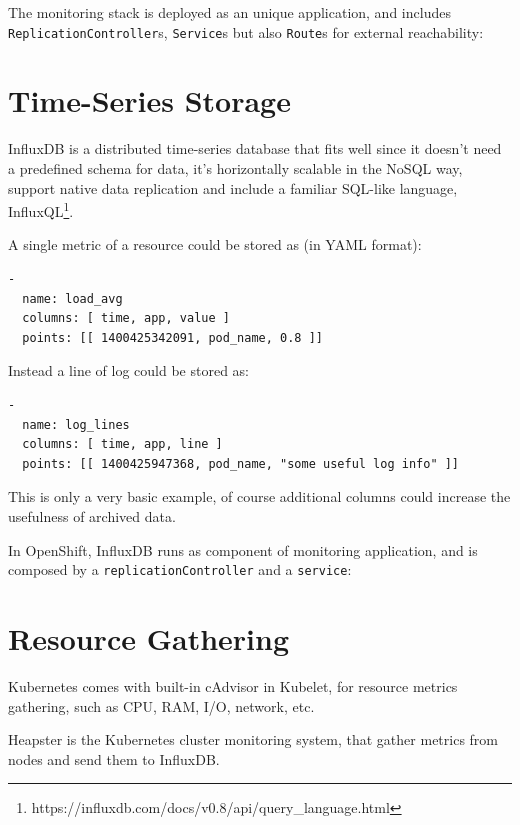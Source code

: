 The monitoring stack is deployed as an unique application, and includes
\texttt{ReplicationController}s, \texttt{Service}s but also
\texttt{Route}s for external reachability:

\section{Time-Series Storage}\label{time-series-storage}

InfluxDB is a distributed time-series database that fits well since it
doesn't need a predefined schema for data, it's horizontally scalable
in the NoSQL way, support native data replication and include a familiar
SQL-like language, InfluxQL\footnote{https://influxdb.com/docs/v0.8/api/query\_language.html}.

A single metric of a resource could be stored as (in YAML format):

\begin{verbatim}
- 
  name: load_avg
  columns: [ time, app, value ]
  points: [[ 1400425342091, pod_name, 0.8 ]]
\end{verbatim}

Instead a line of log could be stored as:

\begin{verbatim}
-
  name: log_lines
  columns: [ time, app, line ]
  points: [[ 1400425947368, pod_name, "some useful log info" ]]
\end{verbatim}

This is only a very basic example, of course additional columns could increase the usefulness of archived data.

In OpenShift, InfluxDB runs as component of monitoring application, and
is composed by a \texttt{replicationController} and a \texttt{service}:

\section{Resource Gathering}\label{resource-gathering}

Kubernetes comes with built-in cAdvisor in Kubelet, for resource metrics gathering, such as CPU, RAM, I/O, network, etc.

Heapster is the Kubernetes cluster monitoring system, that gather metrics from nodes and send them to InfluxDB.

